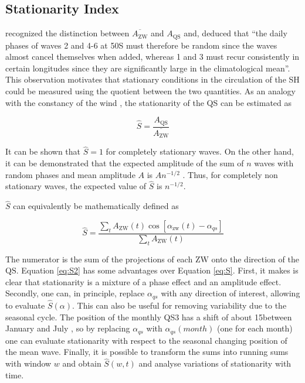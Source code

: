 \documentclass[draft,linenumbers]{agujournal2018}
\begin{document}
\subsection{Stationarity Index}

\citet{Loon1972} recognized the distinction between
\(\overline{A_\mathrm{ZW}}\) and \(A_\mathrm{QS}\) and, deduced that
``the daily phases of waves 2 and 4-6 at 50\degree S must therefore be
random since the waves almost cancel themselves when added, whereas 1
and 3 must recur consistently in certain longitudes since they are
significantly large in the climatological mean''. This observation
motivates that stationary conditions in the circulation of the SH could
be measured using the quotient between the two quantities. As an analogy
with the constancy of the wind \citep{Singer1967}, the stationarity of
the QS can be estimated as

\begin{linenomath*}
\begin{equation}\label{eq:S}
\hat{S} = \frac{A_\mathrm{QS}}{\overline{A_\mathrm{ZW}}}
\end{equation}
\end{linenomath*}

It can be shown that \(\hat{S} = 1\) for completely stationary waves. On
the other hand, it can be demonstrated that the expected amplitude of
the sum of \(n\) waves with random phases and mean amplitude \(A\) is
\(An^{-1/2}\) \citep{Pain2005}. Thus, for completely non stationary
waves, the expected value of \(\hat{S}\) is \(n^{-1/2}\).

\(\hat{S}\) can equivalently be mathematically defined as

\begin{linenomath*}
\begin{equation}\label{eq:S2}
\hat{S} =   \frac{\sum_t A_\mathrm{ZW}(t) \cos  \left [\alpha_\mathrm{zw}(t) - \alpha_{qs} \right ]}{\sum_t A_\mathrm{ZW}(t)}
\end{equation}
\end{linenomath*}

The numerator is the sum of the projections of each \(\mathrm{ZW}\) onto
the direction of the \(\mathrm{QS}\). Equation \ref{eq:S2} has some
advantages over Equation \ref{eq:S}. First, it makes is clear that
stationarity is a mixture of a phase effect and an amplitude effect.
Secondly, one can, in principle, replace \(\alpha_{qs}\) with any
direction of interest, allowing to evaluate \(\hat{S}(\alpha)\). This
can also be useful for removing variability due to the seasonal cycle.
The position of the monthly QS3 has a shift of about 15\degree between
January and July \citep{Loon1972}, so by replacing \(\alpha_{qs}\) with
\(\alpha_{qs}(month)\) (one for each month) one can evaluate
stationarity with respect to the seasonal changing position of the mean
wave. Finally, it is possible to transform the sums into running sums
with window \(w\) and obtain \(\hat{S}(w, t)\) and analyse variations of
stationarity with time.
\end{document}
